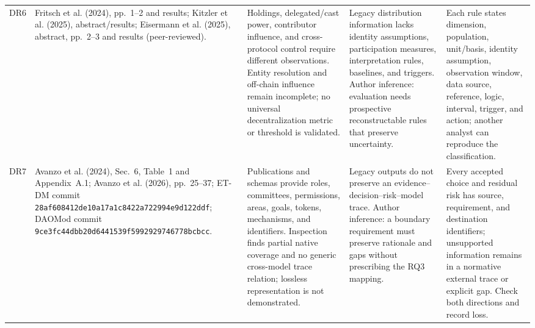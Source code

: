 \documentclass[10pt]{article}
\begin{document}
\begin{landscape}
{\begin{longtable}{@{}p{.035\linewidth}p{.22\linewidth}p{.23\linewidth}p{.22\linewidth}p{.21\linewidth}@{}}
DR6 & Fritsch et al. (2024), pp.~1--2 and results; Kitzler et al. (2025), abstract/results; Eisermann et al. (2025), abstract, pp.~2--3 and results (peer-reviewed). & Holdings, delegated/cast power, contributor influence, and cross-protocol control require different observations. Entity resolution and off-chain influence remain incomplete; no universal decentralization metric or threshold is validated. & Legacy distribution information lacks identity assumptions, participation measures, interpretation rules, baselines, and triggers. Author inference: evaluation needs prospective reconstructable rules that preserve uncertainty. & Each rule states dimension, population, unit/basis, identity assumption, observation window, data source, reference, logic, interval, trigger, and action; another analyst can reproduce the classification. \\
DR7 & Avanzo et al. (2024), Sec.~6, Table~1 and Appendix~A.1; Avanzo et al. (2026), pp.~25--37; ET-DM commit \nolinkurl{28af608412de10a17a1c8422a722994e9d122ddf}; DAOMod commit \nolinkurl{9ce3fc44dbb20d6441539f5992929746778bcbcc}. & Publications and schemas provide roles, committees, permissions, areas, goals, tokens, mechanisms, and identifiers. Inspection finds partial native coverage and no generic cross-model trace relation; lossless representation is not demonstrated. & Legacy outputs do not preserve an evidence--decision--risk--model trace. Author inference: a boundary requirement must preserve rationale and gaps without prescribing the RQ3 mapping. & Every accepted choice and residual risk has source, requirement, and destination identifiers; unsupported information remains in a normative external trace or explicit gap. Check both directions and record loss. \\
\bottomrule
\end{longtable}
}
\end{landscape}
\end{document}
